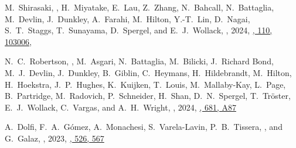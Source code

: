 
\item
M.~Shirasaki, \myself, H.~Miyatake, E.~Lau, Z.~Zhang, N.~Bahcall, N.~Battaglia, M.~Devlin, J.~Dunkley, A.~Farahi, M.~Hilton, Y.-T.~Lin, D.~Nagai, S.~T.~Staggs, T.~Sunayama, D.~Spergel, and E.~J.~Wollack,
,
2024, \href{https://ui.adsabs.harvard.edu/abs/2024arXiv240708201S}{\prd, 110, 103006},

\item
N.~C.~Robertson, \myself, M.~Asgari, N.~Battaglia, M.~Bilicki, J.~Richard Bond, M.~J.~Devlin, J.~Dunkley, B.~Giblin, C.~Heymans, H.~Hildebrandt, M.~Hilton, H.~Hoekstra, J.~P.~Hughes, K.~Kuijken, T.~Louis, M.~Mallaby-Kay, L.~Page, B.~Partridge, M.~Radovich, P.~Schneider, H.~Shan, D.~N.~Spergel, T.~Tröster, E.~J.~Wollack, C.~Vargas, and A.~H.~Wright,
,
2024, \href{https://ui.adsabs.harvard.edu/abs/2024A&A...681A..87R}{\aap, 681, A87}

\item
A.~Dolfi, F.~A.~Gómez, A.~Monachesi, S.~Varela-Lavin, P.~B.~Tissera, \myself, and G.~Galaz,
,
2023, \href{https://ui.adsabs.harvard.edu/abs/2023MNRAS.526..567D}{\mnras, 526, 567}


